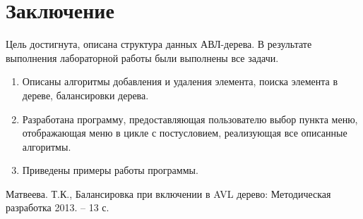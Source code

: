 \documentclass[12pt, a4paper]{article}
\begin{document}
\section*{Заключение}
Цель достигнута, описана структура данных АВЛ-дерева. В результате 
выполнения лабораторной работы были выполнены все задачи.
\begin{enumerate}
\item Описаны алгоритмы добавления и удаления 
элемента, поиска элемента в дереве, балансировки дерева.
\item Разработана программу, предоставляющая пользователю выбор пункта 
меню, отображающая меню в цикле с постусловием, реализующая все описанные 
алгоритмы.
\item Приведены примеры работы программы.
\end{enumerate}
\newpage
\begin{center}
\begin{thebibliography}{}
Матвеева. Т.К., Балансировка при включении в AVL дерево: 
Методическая разработка 2013. – 13 с.
\end{thebibliography}
\end{center}
\end{document}
